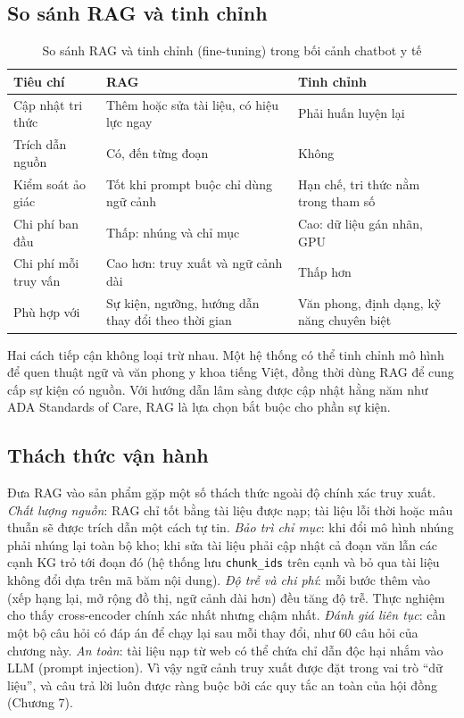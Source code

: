 \subsection{So sánh RAG và tinh chỉnh}

\begin{table}[H]
\centering
\caption{So sánh RAG và tinh chỉnh (fine-tuning) trong bối cảnh chatbot y tế}
\label{tab:rag-ft}
\small
\begin{tabularx}{\linewidth}{@{}L{3.2cm}YY@{}}
\toprule
\textbf{Tiêu chí} & \textbf{RAG} & \textbf{Tinh chỉnh} \\
\midrule
Cập nhật tri thức & Thêm hoặc sửa tài liệu, có hiệu lực ngay & Phải huấn luyện lại \\
Trích dẫn nguồn & Có, đến từng đoạn & Không \\
Kiểm soát ảo giác & Tốt khi prompt buộc chỉ dùng ngữ cảnh & Hạn chế, tri thức nằm trong tham số \\
Chi phí ban đầu & Thấp: nhúng và chỉ mục & Cao: dữ liệu gán nhãn, GPU \\
Chi phí mỗi truy vấn & Cao hơn: truy xuất và ngữ cảnh dài & Thấp hơn \\
Phù hợp với & Sự kiện, ngưỡng, hướng dẫn thay đổi theo thời gian & Văn phong, định dạng, kỹ năng chuyên biệt \\
\bottomrule
\end{tabularx}
\end{table}

Hai cách tiếp cận không loại trừ nhau. Một hệ thống có thể tinh chỉnh mô hình để quen thuật ngữ và văn phong y khoa tiếng Việt, đồng thời dùng RAG để cung cấp sự kiện có nguồn. Với hướng dẫn lâm sàng được cập nhật hằng năm như ADA Standards of Care, RAG là lựa chọn bắt buộc cho phần sự kiện.

\subsection{Thách thức vận hành}

Đưa RAG vào sản phẩm gặp một số thách thức ngoài độ chính xác truy xuất. \emph{Chất lượng nguồn}: RAG chỉ tốt bằng tài liệu được nạp; tài liệu lỗi thời hoặc mâu thuẫn sẽ được trích dẫn một cách tự tin. \emph{Bảo trì chỉ mục}: khi đổi mô hình nhúng phải nhúng lại toàn bộ kho; khi sửa tài liệu phải cập nhật cả đoạn văn lẫn các cạnh KG trỏ tới đoạn đó (hệ thống lưu \texttt{chunk\_ids} trên cạnh và bỏ qua tài liệu không đổi dựa trên mã băm nội dung). \emph{Độ trễ và chi phí}: mỗi bước thêm vào (xếp hạng lại, mở rộng đồ thị, ngữ cảnh dài hơn) đều tăng độ trễ. Thực nghiệm cho thấy cross-encoder chính xác nhất nhưng chậm nhất. \emph{Đánh giá liên tục}: cần một bộ câu hỏi có đáp án để chạy lại sau mỗi thay đổi, như 60 câu hỏi của chương này. \emph{An toàn}: tài liệu nạp từ web có thể chứa chỉ dẫn độc hại nhắm vào LLM (prompt injection). Vì vậy ngữ cảnh truy xuất được đặt trong vai trò ``dữ liệu'', và câu trả lời luôn được ràng buộc bởi các quy tắc an toàn của hội đồng (Chương 7).

